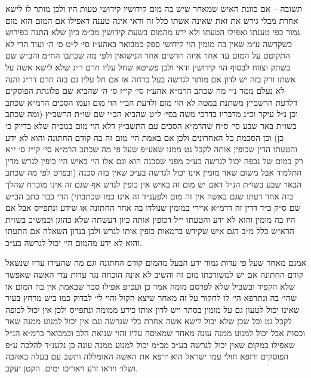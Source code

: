 \documentclass[12pt, openany]{book}
\begin{document}
\begin{multicols}{2}
תשובה – אם כוונת האיש שמאחר שיש בה מום קידושיו קידושי טעות היו ולכן מותר לו לישא אחרת מבלי גירש את זאת שאינה אשתו כלל זה ודאי אינה טענה דאפילו אם המום הוא מום גמור כפי טענתו ואפילו הטעתו ולא ידע מהמום בשעת קידושין מכ״מ כיון שלא התנה בפירוש כשקדשה ע״מ שאין בה מומין הוי קידושי ספק כמבואר באהע״ז סי׳ ל״ט ס׳ ה׳ ועוד הרי לא התקוטט על המום עד אחר איזה חדשים אחר הנישואין ולפי מה שכתבו הח״מ והב״ש שם בשתק וצווח לבסוף הוי קידושין ודאי ולכן פשיטא שחל עליו חרם ר״ג שלא לישא אשה על אשתו ורק בזה יש לדון אם מותר לגרשה בעל כרחה או אם חל עליו גם בזה חרם דר״ג והנה לא נעלם ממר נ״י מה שכתב הרמ״א אהע״ז סי׳ קי״ז ס׳ ה׳ שהביא שם פלוגתת הפוסקים דלדעת הרשב״ץ משתנת במטה לא הוי מום ולדעת הב״י הוי מום ועמו הסכים הרמ״א שכתב וכן נ״ל עיקר וכ״נ מדבריו בדרכי משה בסי׳ ל״ט שהביא הב״י שם שו״ת הרשב״ץ (ומה שכתב בשו״ת באר שבע סי׳ ס״ח שהרמ״א הסכים עם התשב״ץ דלא הוי מום במכ״ה שלא בדיוק כ׳ כן) וכן הסכמת כל האחרונים ולכן אם באמת הי׳ מום זה בה קודם החתונה והוא לא ידע והטעתו הדין שכופין אותה לקבל גט ממנו שאע״פ שעל פי מה שכתב הרמ״א סי׳ קי״ז ס׳ י״א רק במום של נכפה יכול לגרשה בע״כ מפני שסכנה הוא וגם אלו הי׳ באיש היו כופין לגרש מדין התלמוד אבל משום שאר מומין אינו יכול לגרשה בע״כ שאין בזה סכנה (ובפרט לפי מה שכתב הבאר שבע בשו״ת הנ״ל דאם יש מום זה באיש אין כופין לגרש אף שגם זה אינו מוכרח שהלך בזה אחר דעתו שגם באשה אין זה מום ולפענ״ד זה אינו כמו שכתבתי) הרי כבר כתב הב״ש שם ס״ק כ״ד דדין זה דרמ״א איירי במומין שנולדו בה אחר החתונה או שידע ונתפייס אבל אם היו בה מומין והוא לא ידע והטעתו י״ל דכופין אותה כיון דעשתה שלא כהוגן וכמש״כ בשו״ת הרא״ש כלל מ״ב דגם איש שקידש ברמאות כופין אותו לגרש ולכן בנדון השאלה אם התעתו והוא לא ידע מהמום הי׳ יכול לגרשה בע״כ.\\\vspace{0pt}

אמנם מאחר שעל פי עדות גמור ידע הבעל מהמום קודם החתונה וגם מה שהעידו עדיו שנשאל קודם החתונה אם יש למשודכתו מום זה והשיב לא אינה הוכחה נגד עדות עדי האשה שאפשר שלא הקפיד ובשביל שלא לפרסם מומה אמר כן ועכ״פ אפילו סבר שבאמת אין בה המום או שהי׳ בה ונתרפא הי׳ לו לחקור על זה מאחר שיצא הקול והוי לי׳ לבדוק כמו ביש מרחץ בעיר שאינו יכול לטעון גם על מומין בסתר ויש לדון אותו כידע ממומה ונתפייס ולכן אין יכול לכופה לקבל גט וכל שכן שלא יכול לישא אשה אחרת בלי שגרשה וגם אין יכול למנוע ממנה שאר וכסות אבל יכול למנוע ממנה עונה מאחר שמאוסה עליו והוי שנואת הלב וכמבואר ברמ״א הנ״ל שאפילו במקום שאין יכול לגרשה בע״כ מכ״מ יכול למנוע ממנה עונה כן נלענ״ד להלכה ע״פ הפוסקים ורופא חולי עמו ישראל הוא ירפא את האשה האומללה ותשב עם בעלה באהבה ושלו׳ ויראו זרע ויאריכו ימים. הקטן יעקב.\\\vspace{0pt}

\end{multicols}\newpage
\end{document}
